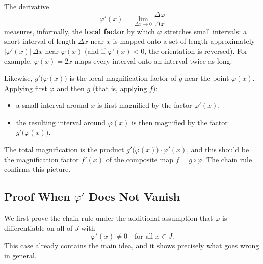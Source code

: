 \documentclass[
  letterpaper,
  DIV=11,
  numbers=noendperiod]{scrreprt}
\providecommand{\tightlist}{%
  \setlength{\itemsep}{0pt}\setlength{\parskip}{0pt}}
\theoremstyle{plain}
\theoremstyle{plain}
\theoremstyle{definition}
\theoremstyle{definition}
\theoremstyle{definition}
\theoremstyle{plain}
\theoremstyle{plain}
\theoremstyle{remark}
\begin{document}
The derivative \[
\varphi'(x) = \lim_{\Delta x\to0}\frac{\Delta\varphi}{\Delta x}
\] measures, informally, the \textbf{local factor} by which \(\varphi\)
stretches small intervals: a short interval of length \(\Delta x\) near
\(x\) is mapped onto a set of length approximately
\(\lvert \varphi'(x) \rvert\,\Delta x\) near \(\varphi(x)\) (and if
\(\varphi'(x)<0\), the orientation is reversed). For example,
\(\varphi(x) = 2x\) maps every interval onto an interval twice as long.

Likewise, \(g'\big(\varphi(x)\big)\) is the local magnification factor
of \(g\) near the point \(\varphi(x)\). Applying first \(\varphi\) and
then \(g\) (that is, applying \(f\)):

\begin{itemize}
\tightlist
\item
  a small interval around \(x\) is first magnified by the factor
  \(\varphi'(x)\),
\item
  the resulting interval around \(\varphi(x)\) is then magnified by the
  factor \(g'\big(\varphi(x)\big)\).
\end{itemize}

The total magnification is the product
\(g'\big(\varphi(x)\big)\cdot\varphi'(x)\), and this should be the
magnification factor \(f'(x)\) of the composite map
\(f = g\circ\varphi\). The chain rule confirms this picture.

\subsection{\texorpdfstring{Proof When \(\varphi'\) Does Not
Vanish}{Proof When \textbackslash varphi\textquotesingle{} Does Not Vanish}}\label{proof-when-varphi-does-not-vanish}

We first prove the chain rule under the additional assumption that
\(\varphi\) is differentiable on all of \(J\) with \[
\varphi'(x)\neq 0 \quad\text{for all } x\in J .
\] This case already contains the main idea, and it shows precisely what
goes wrong in general.
\end{document}
